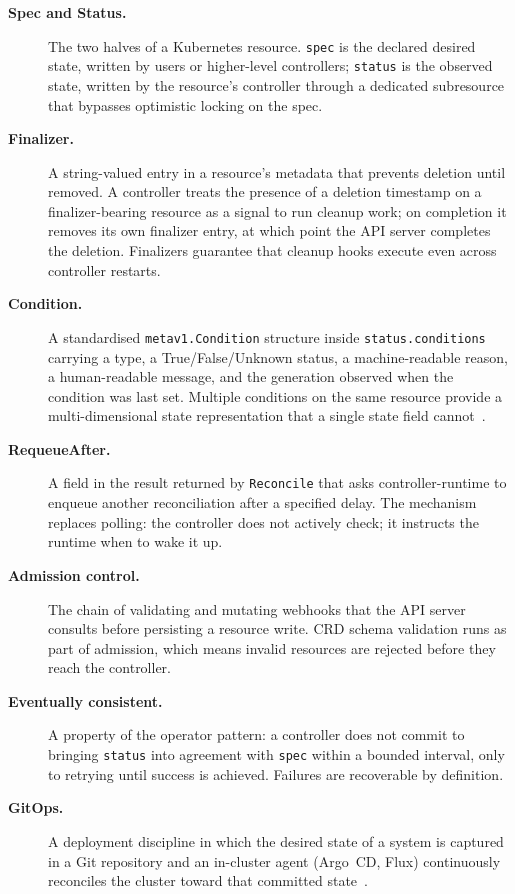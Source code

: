 \begin{description}
    \item[\textbf{Spec and Status.}] The two halves of a Kubernetes resource. \texttt{spec} is the declared desired state, written by users or higher-level controllers; \texttt{status} is the observed state, written by the resource's controller through a dedicated subresource that bypasses optimistic locking on the spec.

    \item[\textbf{Finalizer.}] A string-valued entry in a resource's metadata that prevents deletion until removed. A controller treats the presence of a deletion timestamp on a finalizer-bearing resource as a signal to run cleanup work; on completion it removes its own finalizer entry, at which point the API server completes the deletion. Finalizers guarantee that cleanup hooks execute even across controller restarts.

    \item[\textbf{Condition.}] A standardised \texttt{metav1.Condition} structure inside \texttt{status.conditions} carrying a type, a True/False/Unknown status, a machine-readable reason, a human-readable message, and the generation observed when the condition was last set. Multiple conditions on the same resource provide a multi-dimensional state representation that a single state field cannot~\cite{ibryam2020}.

    \item[\textbf{RequeueAfter.}] A field in the result returned by \texttt{Reconcile} that asks controller-runtime to enqueue another reconciliation after a specified delay. The mechanism replaces polling: the controller does not actively check; it instructs the runtime when to wake it up.

    \item[\textbf{Admission control.}] The chain of validating and mutating webhooks that the API server consults before persisting a resource write. CRD schema validation runs as part of admission, which means invalid resources are rejected before they reach the controller.

    \item[\textbf{Eventually consistent.}] A property of the operator pattern: a controller does not commit to bringing \texttt{status} into agreement with \texttt{spec} within a bounded interval, only to retrying until success is achieved. Failures are recoverable by definition.

    \item[\textbf{GitOps.}] A deployment discipline in which the desired state of a system is captured in a Git repository and an in-cluster agent (Argo~CD, Flux) continuously reconciles the cluster toward that committed state~\cite{argocd, gitops}.
\end{description}

